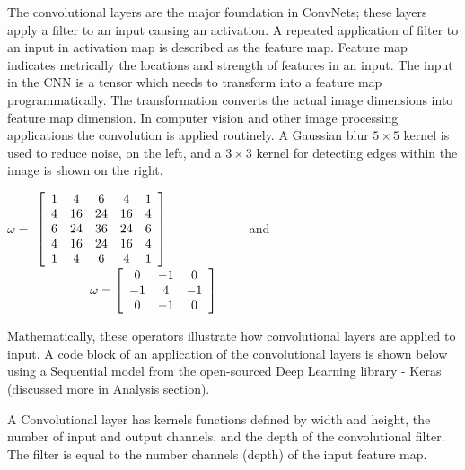 The convolutional layers are the major foundation in ConvNets; these layers apply a filter to an input causing an activation. A repeated application of filter to an input in activation map is described as the feature map. Feature map indicates metrically the locations and strength of features in an input. The input in the CNN is a tensor which needs to transform into a feature map programmatically. The transformation converts the actual image dimensions into feature map dimension. In computer vision and other image processing applications the convolution is applied routinely. A Gaussian blur $5\times 5$ kernel is used to reduce noise, on the left, and a $3\times 3$ kernel for detecting edges within the image is shown on the right. 

\begin{center}
$\omega = $
$\left[\begin{array}{ccccc}
1 & 4 & 6 & 4 & 1	\\
4 & 16 & 24 & 16 & 4	\\
6 & 24 & 36 & 24 & 6	\\
4 & 16 & 24 & 16 & 4 \\ 
1 & 4 & 6 & 4 & 1 \\
\end{array}\right] \hspace{23mm} $and$
\hspace{23mm }\omega = \left[\begin{array}{ccc}
0 & -1 & 0\\
-1 & 4 & -1 \\
0 & -1 & 0 \\
\end{array}\right]$
\end{center}

Mathematically, these operators illustrate how convolutional layers are applied to input. A code block of an application of the convolutional layers is shown below using a Sequential model from the open-sourced Deep Learning library - Keras (discussed more in Analysis section). \\

\begin{center}
\end{center}

A Convolutional layer has kernels functions defined by width and height, the number of input and output channels, and the depth of the convolutional filter. The filter is equal to the number channels (depth) of the input feature map. \\

